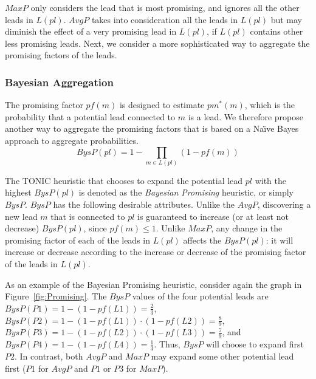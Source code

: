 \documentclass[journal]{IEEEtran}
\newcommand{\pf}{{\textit pf}}
\begin{document}


$MaxP$ only considers the lead that is most promising, and ignores all the other leads in $L(pl)$. $AvgP$ takes into consideration all the leads in $L(pl)$ but may diminish the effect of a very promising lead in $L(pl)$, if $L(pl)$ contains other less promising leads. Next, we consider a more sophisticated way to aggregate the promising factors of the leads.




\subsubsection{Bayesian Aggregation}
The promising factor $pf(m)$ is designed to estimate $pm^*(m)$, which is the probability that a potential lead connected to $m$ is a lead. 
We therefore propose another way to aggregate the promising factors that is based on a Na\"{\i}ve Bayes approach to aggregate probabilities.
\begin{equation}
\displaystyle BysP(pl)=1-\prod_{m\in L(pl)}(1-pf(m)) 
\end{equation}

\noindent The TONIC heuristic that chooses to expand the potential lead $pl$ with the highest $BysP(pl)$ is denoted as the {\em Bayesian Promising} heuristic, or simply $BysP$. $BysP$ has the following desirable attributes. Unlike the $AvgP$, discovering a new lead $m$ that is connected to $pl$ is guaranteed to increase (or at least not decrease) $BysP(pl)$, since $pf(m)\leq 1$. Unlike $MaxP$, any change in the promising factor of each of the leads in $L(pl)$ affects the $BysP(pl)$: it will increase or decrease according to the increase or decrease of the promising factor of the leads in $L(pl)$.


As an example of the Bayesian Promising heuristic, consider again the graph in Figure~\ref{fig:Promising}. 
The $BysP$ values of the four potential leads are $BysP(P1)=1-(1-pf(L1))=\frac{2}{3}$, 
$BysP(P2)=1-(1-pf(L1))\cdot(1-pf(L2))=\frac{8}{9}$, 
$BysP(P3)=1-(1-pf(L2))\cdot(1-pf(L3))=\frac{7}{9}$, and $BysP(P4)=1-(1-pf(L4))=\frac{1}{3}$. 
Thus, $BysP$ will choose to expand first $P2$. 
In contrast, both $AvgP$ and $MaxP$ may expand some other potential lead first ($P1$ for $AvgP$ and $P1$ or $P3$ for $MaxP$). 
\end{document}
